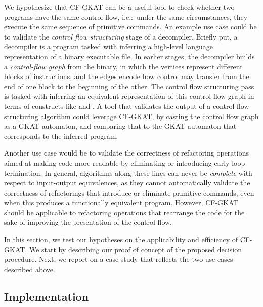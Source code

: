 We hypothesize that CF-GKAT can be a useful tool to check whether two programs have the same control flow, i.e.:\ under the same circumstances, they execute the same sequence of primitive commands.
An example use case could be to validate
the \emph{control flow structuring} stage of a decompiler.
Briefly put, a decompiler is a program tasked with inferring a high-level language representation of a binary executable file.
In earlier stages, the decompiler builds a \emph{control-flow graph} from the binary, in which the vertices represent different blocks of instructions, and the edges encode how control may transfer from the end of one block to the beginning of the other.
The control flow structuring pass is tasked with inferring an equivalent representation of this control flow graph in terms of constructs like  and .
A tool that validates the output of a control flow structuring algorithm could leverage CF-GKAT, by casting the control flow graph as a GKAT automaton, and comparing that to the GKAT automaton that corresponds to the inferred program.

Another use case would be to validate
the correctness of refactoring operations aimed at making code more readable by eliminating or introducing early loop termination.
In general, algorithms along these lines can never be \emph{complete} with respect to input-output equivalences, as they cannot automatically validate the correctness of refactorings that introduce or eliminate primitive commands, even when this produces a functionally equivalent program.
However, CF-GKAT should be applicable to refactoring operations that rearrange the code for the sake of improving the presentation of the control flow.

In this section, we test our hypotheses on the applicability and efficiency of CF-GKAT\@.
We start by describing our proof of concept of the proposed decision procedure.
Next, we report on a case study that reflects the two use cases described above.

\subsection{Implementation}

